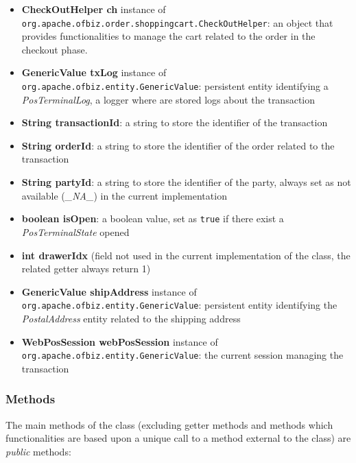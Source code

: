 \begin{itemize}
    \item \textbf{CheckOutHelper ch} instance of \\ \texttt{org.apache.ofbiz.order.shoppingcart.CheckOutHelper}: an object that provides functionalities to manage the cart related to the order in the checkout phase.
    \item \textbf{GenericValue txLog} instance of \\ \texttt{org.apache.ofbiz.entity.GenericValue}: persistent entity identifying a \emph{PosTerminalLog}, a logger where are stored logs about the transaction
    \item \textbf{String transactionId}: a string to store the identifier of the transaction
    \item \textbf{String orderId}: a string to store the identifier of the order related to the transaction
    \item \textbf{String partyId}: a string to store the identifier of the party, always set as not available (\emph{\_NA\_}) in the current  implementation
    \item \textbf{boolean isOpen}: a boolean value, set as \texttt{true} if there exist a \emph{PosTerminalState} opened
    \item \textbf{int drawerIdx} (field not used in the current implementation of the class, the related getter always return 1)
    \item \textbf{GenericValue shipAddress} instance of \\ \texttt{org.apache.ofbiz.entity.GenericValue}: persistent entity identifying the \emph{PostalAddress} entity related to the shipping address
    \item \textbf{WebPosSession webPosSession} instance of \\ \texttt{org.apache.ofbiz.entity.GenericValue}: the current session managing the transaction
\end{itemize}
\clearpage
\subsubsection{Methods}

The main methods of the class (excluding getter methods and methods which functionalities are based upon a unique call to a method external to the class) are \emph{public} methods:

